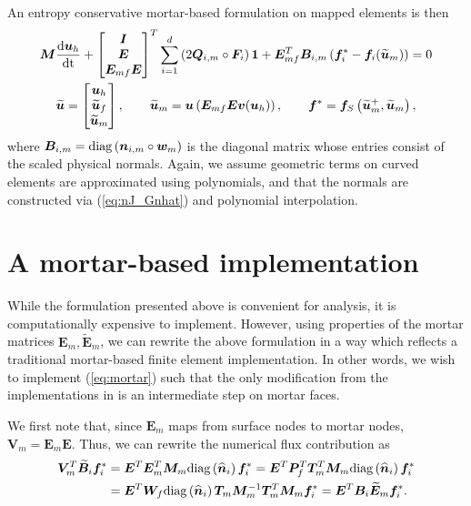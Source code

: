 \documentclass{svjour3}                     %
\renewcommand{\hat}{\widehat}
\renewcommand{\tilde}{\widetilde}
\newcommand{\diag}[1]{{\rm diag}\LRp{#1}}
\newcommand{\td}[2]{\frac{{\rm d}#1}{{\rm d}{\rm #2}}}
\newcommand{\LRp}[1]{\left( #1 \right)}
\renewcommand{\note}[1]{{\color{blue}{#1}}}
\begin{document}
An entropy conservative mortar-based formulation on mapped elements is then
\begin{gather}
{\bm{M}}\td{\bm{u}_h}{t} + \begin{bmatrix} \bm{I} \\ \bm{E} \\ \bm{E}_{mf}\bm{E} \end{bmatrix}^T
\sum_{i=1}^d \LRp{2{\bm{Q}}_{i,m} \circ \bm{F}_i}\bm{1} + \bm{E}_{mf}^T{\bm{B}}_{i,m}\LRp{\bm{f}_i^*-\bm{f}_i(\tilde{\bm{u}}_m)} = 0 \label{eq:esdgm}\\
\tilde{\bm{u}} = \begin{bmatrix}
\bm{u}_h\\
\tilde{\bm{u}}_f\\
\tilde{\bm{u}}_m
\end{bmatrix}, \qquad \tilde{\bm{u}}_m = \bm{u}\LRp{\bm{E}_{mf}\bm{E}\bm{v}(\bm{u}_h)}, \qquad \bm{f}^* = \bm{f}_S\LRp{\tilde{\bm{u}}_m^+,\tilde{\bm{u}}_m},
\end{gather}
where $\bm{B}_{i,m} = \diag{\bm{n}_{i,m}\circ \bm{w}_m}$ is the diagonal matrix whose entries consist of the scaled physical normals.  Again, we assume geometric terms on curved elements are approximated using polynomials, and that the normals are constructed via (\ref{eq:nJ_Gnhat}) and polynomial interpolation.  






\section{A mortar-based implementation}

While the formulation presented above is convenient for analysis, it is computationally expensive to implement.  However, using properties of the mortar matrices $\bm{E}_m, \tilde{\bm{E}}_m$, we can rewrite the above formulation in a way which reflects a traditional mortar-based finite element implementation.  In other words, we wish to implement (\ref{eq:mortar}) such that the only modification from the implementations in \cite{chan2017discretely} is an intermediate step on mortar faces.  

We first note that, since $\bm{E}_m$ maps from surface nodes to mortar nodes, $\bm{V}_m = \bm{E}_m \bm{E}$.  Thus, we can rewrite the numerical flux contribution as
\begin{align*}
 \bm{V}_m^T\tilde{\bm{B}}_i\bm{f}_i^* &= \bm{E}^T \bm{E}_m^T \bm{M}_m\diag{\hat{\bm{n}}_i} \bm{f}_i^* = \bm{E}^T  \bm{P}_f^T\bm{T}_m^T\bm{M}_m\diag{\hat{\bm{n}}_i} \bm{f}_i^*\\
 &= \bm{E}^T \bm{W}_f \diag{\hat{\bm{n}}_i} \bm{T}_m\bm{M}_m^{-1}\bm{T}_m^T\bm{M}_m \bm{f}_i^* =  \bm{E}^T \bm{B}_i \tilde{\bm{E}}_m\bm{f}_i^*.
\end{align*}
\end{document}
